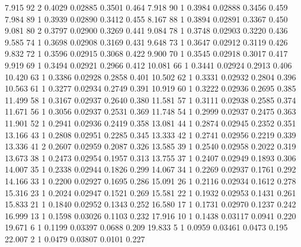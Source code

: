 \documentclass[handout,12pt,dvipsnames,t]{beamer}
\begin{document}
\begin{frame}[fragile]
{\begin{Schunk}
\begin{Soutput}
  7.915     92       2   0.4029 0.02885       0.3501        0.464
  7.918     90       1   0.3984 0.02888       0.3456        0.459
  7.984     89       1   0.3939 0.02890       0.3412        0.455
  8.167     88       1   0.3894 0.02891       0.3367        0.450
  9.081     80       2   0.3797 0.02900       0.3269        0.441
  9.084     78       1   0.3748 0.02903       0.3220        0.436
  9.585     74       1   0.3698 0.02908       0.3169        0.431
  9.648     73       1   0.3647 0.02912       0.3119        0.426
  9.832     72       1   0.3596 0.02915       0.3068        0.422
  9.900     70       1   0.3545 0.02918       0.3017        0.417
  9.919     69       1   0.3494 0.02921       0.2966        0.412
 10.081     66       1   0.3441 0.02924       0.2913        0.406
 10.420     63       1   0.3386 0.02928       0.2858        0.401
 10.502     62       1   0.3331 0.02932       0.2804        0.396
 10.563     61       1   0.3277 0.02934       0.2749        0.391
 10.919     60       1   0.3222 0.02936       0.2695        0.385
 11.499     58       1   0.3167 0.02937       0.2640        0.380
 11.581     57       1   0.3111 0.02938       0.2585        0.374
 11.671     56       1   0.3056 0.02937       0.2531        0.369
 11.748     54       1   0.2999 0.02937       0.2475        0.363
 11.901     52       1   0.2941 0.02936       0.2419        0.358
 13.081     44       1   0.2874 0.02945       0.2352        0.351
 13.166     43       1   0.2808 0.02951       0.2285        0.345
 13.333     42       1   0.2741 0.02956       0.2219        0.339
 13.336     41       2   0.2607 0.02959       0.2087        0.326
 13.585     39       1   0.2540 0.02958       0.2022        0.319
 13.673     38       1   0.2473 0.02954       0.1957        0.313
 13.755     37       1   0.2407 0.02949       0.1893        0.306
 14.007     35       1   0.2338 0.02944       0.1826        0.299
 14.067     34       1   0.2269 0.02937       0.1761        0.292
 14.166     33       1   0.2200 0.02927       0.1695        0.286
 15.091     26       1   0.2116 0.02934       0.1612        0.278
 15.316     23       1   0.2024 0.02947       0.1521        0.269
 15.581     22       1   0.1932 0.02953       0.1431        0.261
 15.833     21       1   0.1840 0.02952       0.1343        0.252
 16.580     17       1   0.1731 0.02970       0.1237        0.242
 16.999     13       1   0.1598 0.03026       0.1103        0.232
 17.916     10       1   0.1438 0.03117       0.0941        0.220
 19.671      6       1   0.1199 0.03397       0.0688        0.209
 19.833      5       1   0.0959 0.03461       0.0473        0.195
 22.007      2       1   0.0479 0.03807       0.0101        0.227
\end{Soutput}
\end{Schunk}
}

\normalsize

\end{frame}
\end{document}
